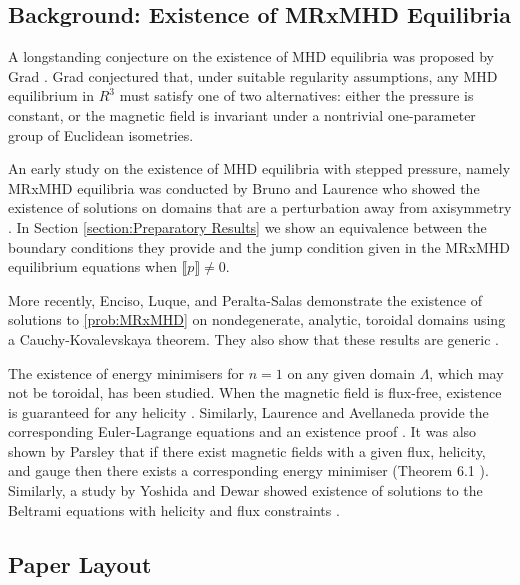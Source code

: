 \documentclass[11pt]{article}
\theoremstyle{plain}
\theoremstyle{definition}
\theoremstyle{remark}
\newcommand{\ST}{\Lambda}
\begin{document}
\subsection{Background: Existence of MRxMHD Equilibria}



A longstanding conjecture on the existence of MHD equilibria was proposed by Grad \cite{grad_conjecture}. Grad conjectured that, under suitable regularity assumptions, any MHD equilibrium in \(R^3\) must satisfy one of two alternatives: either the pressure is constant, or the magnetic field is invariant under a nontrivial one-parameter group of Euclidean isometries.




An early study on the existence of MHD equilibria with stepped pressure, namely MRxMHD equilibria was conducted by Bruno and Laurence who showed the existence of solutions on domains that are a perturbation away from axisymmetry \cite{bruno_laurence_1996}. In Section \ref{section:Preparatory Results} we show an equivalence between the boundary conditions they provide and the jump condition given in the MRxMHD equilibrium equations when \(\llbracket p \rrbracket \neq 0\).


More recently, Enciso, Luque, and Peralta-Salas demonstrate the existence of solutions to \eqref{prob:MRxMHD} on nondegenerate, analytic, toroidal domains using a Cauchy-Kovalevskaya theorem. They also show that these results are generic \cite{enciso2023mhd}.

The existence of energy minimisers for \(n=1\) on any given domain \(\ST\), which may not be toroidal, has been studied. When the magnetic field is flux-free, existence is guaranteed for any helicity \cite{exist_gerner}. Similarly, Laurence and Avellaneda provide the corresponding Euler-Lagrange equations and an existence proof \cite{laurence1991woltjer}. It was also shown by Parsley that if there exist magnetic fields with a given flux, helicity, and gauge then there exists a corresponding energy minimiser (Theorem 6.1 \cite{parsley2001taylor}). Similarly, a study by Yoshida and Dewar showed existence of solutions to the Beltrami equations with helicity and flux constraints \cite{yoshida2012helical}. 



\subsection{Paper Layout}
\end{document}
